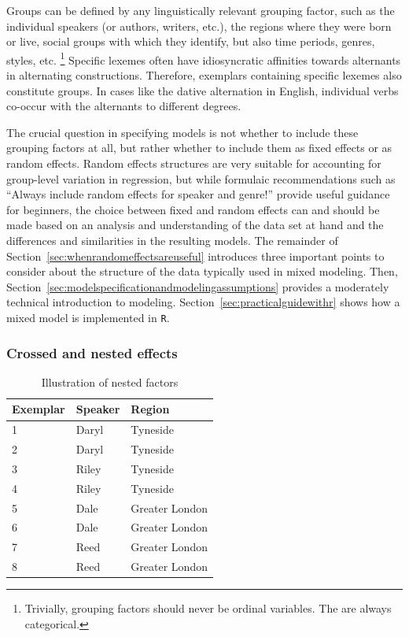 Groups can be defined by any linguistically relevant grouping factor, such as the individual speakers (or authors, writers, etc.), the regions where they were born or live, social groups with which they identify, but also time periods, genres, styles, etc.%
\footnote{Trivially, grouping factors should never be ordinal variables.
The are always categorical.}
Specific lexemes often have idiosyncratic affinities towards alternants in alternating constructions.
Therefore, exemplars containing specific lexemes also constitute groups.
In cases like the dative alternation in English, individual verbs co-occur with the alternants to different degrees.

The crucial question in specifying models is not whether to include these grouping factors at all, but rather whether to include them as fixed effects or as random effects.
Random effects structures are very suitable for accounting for group-level variation in regression, but while formulaic recommendations such as ``Always include random effects for speaker and genre!'' provide useful guidance for beginners, the choice between fixed and random effects can and should be made based on an analysis and understanding of the data set at hand and the differences and similarities in the resulting models.
The remainder of Section~\ref{sec:whenrandomeffectsareuseful} introduces three important points to consider about the structure of the data typically used in mixed modeling.
Then, Section~\ref{sec:modelspecificationandmodelingassumptions} provides a moderately technical introduction to modeling.
Section~\ref{sec:practicalguidewithr} shows how a mixed model is implemented in \texttt{R}.


\subsubsection{Crossed and nested effects}
\label{sec:crossedandnestedeffects}

\begin{table}
  \centering
  \begin{tabular}{lll}
    \toprule
    \textbf{Exemplar} & \textbf{Speaker}  & \textbf{Region}        \\
    \midrule
                    1 &           Daryl  &         Tyneside       \\
                    2 &           Daryl  &         Tyneside       \\
                    3 &           Riley  &         Tyneside       \\
                    4 &           Riley  &         Tyneside       \\
                    5 &           Dale   &         Greater London \\
                    6 &           Dale   &         Greater London \\
                    7 &           Reed   &         Greater London \\
                    8 &           Reed   &         Greater London \\
    \bottomrule
  \end{tabular}
  \caption{Illustration of nested factors}
  \label{tab:nested}
\end{table}


